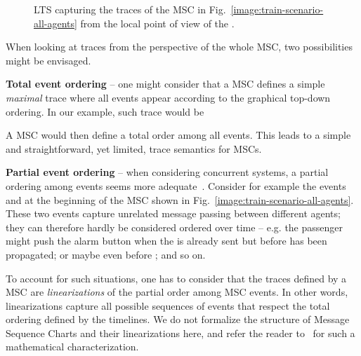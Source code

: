\vspace{0.5cm}
\begin{figure}[H]\centering
{}
\caption{LTS capturing the traces of the MSC in Fig.~\ref{image:train-scenario-all-agents} from the local point of view of the .\label{image:local-traces-lts}}
\end{figure}

When looking at traces from the perspective of the whole MSC, two possibilities might be envisaged.

\noindent \textbf{Total event ordering} -- one might consider that a MSC defines a simple \emph{maximal} trace where all events appear according to the graphical top-down ordering. In our example, such trace would be

\begin{center}\end{center} 

A MSC would then define a total order among all events. This leads to a simple and straightforward, yet limited, trace semantics for MSCs.

\noindent \textbf{Partial event ordering} -- when considering concurrent systems, a partial ordering among events seems more adequate~\cite{ITU:1996, Uchitel:2003}. Consider for example the events  and  at the beginning of the MSC shown in Fig.~\ref{image:train-scenario-all-agents}. These two events capture unrelated message passing between different agents; they can therefore hardly be considered ordered over time -- e.g. the passenger might push the alarm button when the  is already sent but before  has been propagated; or maybe even before ; and so on. 

To account for such situations, one has to consider that the traces defined by a MSC are \emph{linearizations} of the partial order among MSC events. In other words, linearizations capture all possible sequences of events that respect the total ordering defined by the timelines. We do not formalize the structure of Message Sequence Charts and their linearizations here, and refer the reader to~\cite{Uchitel:2003} for such a mathematical characterization. 

